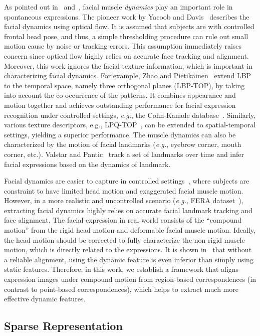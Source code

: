 \documentclass[journal]{IEEEtran}
\begin{document}
As pointed out in~\cite{Ekman2005} and~\cite{Ambadar05}, facial muscle \textit{dynamics} play an important role in spontaneous expressions. The pioneer work by Yacoob and Davis~\cite{Yacoob_PAMI96} describes the facial dynamics using optical flow. It is assumed that subjects are with controlled frontal head pose, and thus, a simple thresholding procedure can rule out small motion cause by noise or tracking errors. This assumption immediately raises concern since optical flow highly relies on accurate face tracking and alignment. Moreover, this work ignores the facial texture information, which is important in characterizing facial dynamics. For example, Zhao and Pietik\"ainen~\cite{Zhao_PAMI07} extend LBP to the temporal space, namely three orthogonal planes (LBP-TOP), by taking into account the co-occurrence of the patterns. It combines appearance and motion together and achieves outstanding performance for facial expression recognition under controlled settings, \textit{e.g.}, the Cohn-Kanade database~\cite{CKplus}. Similarly, various texture descriptors, e.g., LPQ-TOP~\cite{LPQ-TOP}, can be extended to spatial-temporal settings, yielding a superior performance. The muscle dynamics can also be characterized by the motion of facial landmarks (\textit{e.g.}, eyebrow corner, mouth corner, etc.). Valstar and Pantic~\cite{Valstar_SMCB12} track a set of landmarks over time and infer facial expressions based on the dynamics of landmark. 

Facial dynamics are easier to capture in controlled settings~\cite{CKplus}, where subjects are constraint to have limited head motion and exaggerated facial muscle motion. However, in a more realistic and uncontrolled scenario (\textit{e.g.}, FERA dataset~\cite{Valstar_FERA11}), extracting facial dynamics highly relies on accurate facial landmark tracking and face alignment. The facial expression in real world consists of the ``compound motion'' from the rigid head motion and deformable facial muscle motion. Ideally, the head motion should be corrected to fully characterize the non-rigid muscle motion, which is directly related to the expressions. It is shown in~\cite{Valstar12,Yang_SMCB12} that without a reliable alignment, using the dynamic feature is even inferior than simply using static features. Therefore, in this work, we establish a framework that aligns expression images under compound motion from region-based correspondences (in contrast to point-based correspondences), which helps to extract much more effective dynamic features. 


\subsection{Sparse Representation}
\end{document}
